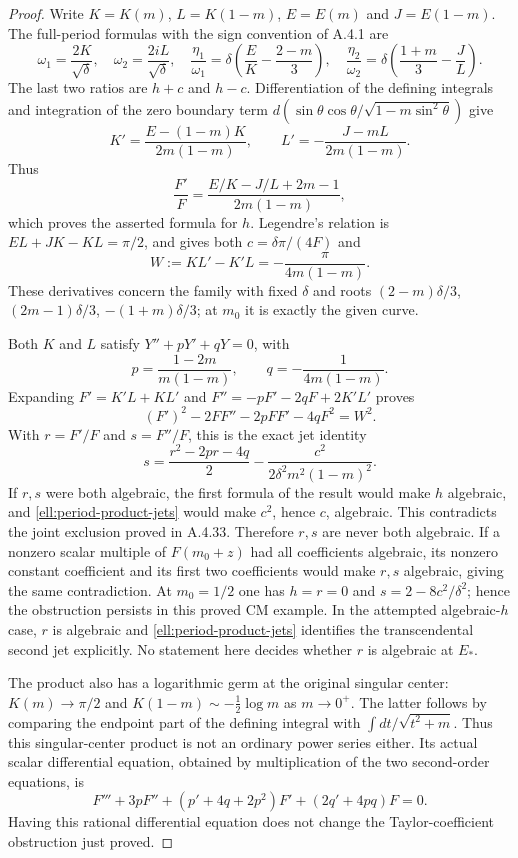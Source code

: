\begin{proof}
Write $K=K(m)$, $L=K(1-m)$, $E=E(m)$ and $J=E(1-m)$.
The full-period formulas with the sign convention of A.4.1 are
\[
 \omega_1=\frac{2K}{\sqrt\delta},\quad
 \omega_2=\frac{2iL}{\sqrt\delta},\quad
 \frac{\eta_1}{\omega_1}
       =\delta\left(\frac EK-\frac{2-m}{3}\right),\quad
 \frac{\eta_2}{\omega_2}
       =\delta\left(\frac{1+m}{3}-\frac JL\right).
\]
The last two ratios are $h+c$ and $h-c$.
Differentiation of the defining integrals and integration of the
zero boundary term
$d(\sin\theta\cos\theta/\sqrt{1-m\sin^2\theta})$ give
\[
 K'=\frac{E-(1-m)K}{2m(1-m)},\qquad
 L'=-\frac{J-mL}{2m(1-m)}.
\]
Thus
\[
 \frac{F'}F=\frac{E/K-J/L+2m-1}{2m(1-m)},
\]
which proves the asserted formula for $h$.
Legendre's relation is $EL+JK-KL=\pi/2$, and gives both
$c=\delta\pi/(4F)$ and
\[
 W:=KL'-K'L=-\frac{\pi}{4m(1-m)}.
\]
These derivatives concern the family with fixed $\delta$ and roots
$(2-m)\delta/3$, $(2m-1)\delta/3$, $-(1+m)\delta/3$;
at $m_0$ it is exactly the given curve.

Both $K$ and $L$ satisfy $Y''+pY'+qY=0$, with
\[
 p=\frac{1-2m}{m(1-m)},\qquad q=-\frac1{4m(1-m)}.
\]
Expanding $F'=K'L+KL'$ and
$F''=-pF'-2qF+2K'L'$ proves
\[
 (F')^2-2FF''-2pFF'-4qF^2=W^2.
\]
With $r=F'/F$ and $s=F''/F$, this is the exact jet identity
\begin{equation}\label{ell:period-product-jets}
 s=\frac{r^2-2pr-4q}{2}
       -\frac{c^2}{2\delta^2m^2(1-m)^2}.
\end{equation}
If $r,s$ were both algebraic, the first formula of the result would
make $h$ algebraic, and \eqref{ell:period-product-jets} would make
$c^2$, hence $c$, algebraic. This contradicts the joint exclusion
proved in A.4.33. Therefore $r,s$ are never both algebraic.
If a nonzero scalar multiple of $F(m_0+z)$ had all coefficients
algebraic, its nonzero constant coefficient and its first two
coefficients would make $r,s$ algebraic, giving the same contradiction.
At $m_0=1/2$ one has $h=r=0$ and
$s=2-8c^2/\delta^2$; hence the obstruction persists in this proved
CM example. In the attempted algebraic-$h$ case, $r$ is algebraic
and \eqref{ell:period-product-jets} identifies the transcendental
second jet explicitly. No statement here decides whether $r$ is
algebraic at $E_*$.

The product also has a logarithmic germ at the original singular
center: $K(m)\to\pi/2$ and
$K(1-m)\sim-\tfrac12\log m$ as $m\to0^+$.
The latter follows by comparing the endpoint part of the defining
integral with $\int dt/\sqrt{t^2+m}$.
Thus this singular-center product is not an ordinary power series
either. Its actual scalar differential equation, obtained by
multiplication of the two second-order equations, is
\[
 F'''+3pF''+(p'+4q+2p^2)F'+(2q'+4pq)F=0.
\]
Having this rational differential equation does not change the
Taylor-coefficient obstruction just proved.


\end{proof}
